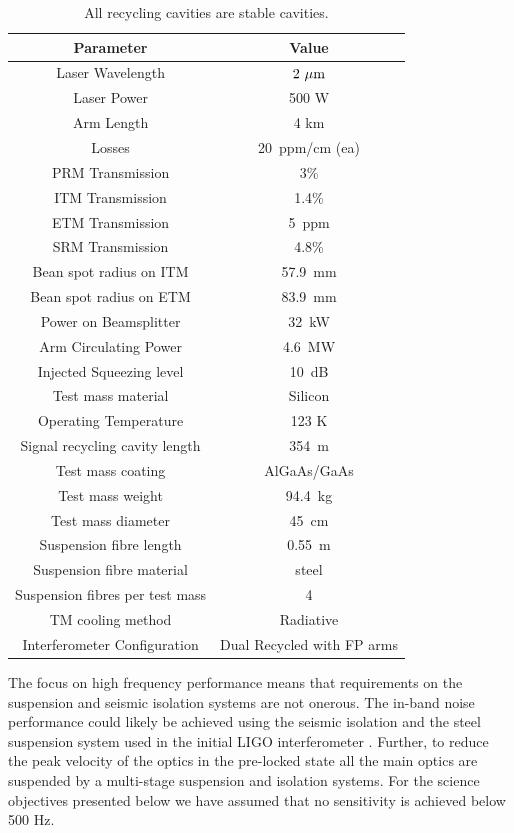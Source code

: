 \documentclass[prx,superscriptaddress,twocolumn,nopreprintnumbers,floatfix,nofootinbib]{revtex4}
\begin{document}
\begin{table}[]
    \centering
    \begin{tabular}{c c}
    
         Parameter & Value \\
         \hline
        \hline
         Laser Wavelength & $ 2~\rm{\mu m}$ \\
         Laser Power & 500 W \\
         Arm Length & 4 km \\ 
         Losses & 20~ppm/cm (ea) \\
         PRM Transmission & 3\% \\
         ITM Transmission & 1.4\% \\
         ETM Transmission & 5~ppm \\
         SRM Transmission & 4.8\% \\
         Bean spot radius on ITM & 57.9~mm\\
         Bean spot radius on ETM & 83.9~mm\\
         Power on Beamsplitter & 32~kW \\
         Arm Circulating Power & 4.6~MW \\
         Injected Squeezing level & 10~dB \\
         Test mass material & Silicon \\
         Operating Temperature & 123 K \\
         Signal recycling cavity length & 354~m \\
         Test mass coating & AlGaAs/GaAs \\
         Test mass weight & 94.4~kg \\
         Test mass diameter & 45~cm \\
         Suspension fibre length &	0.55~m \\
         Suspension fibre material & steel \\
         Suspension fibres per test mass &	4 \\
         TM cooling method & Radiative \\
         Interferometer Configuration & Dual Recycled with FP arms \\
         \hline
    \end{tabular}
    \caption{All recycling cavities are stable cavities.
    }
    \label{tab:design}
\end{table}

The focus on high frequency performance means that requirements on the suspension and seismic isolation systems are not onerous. The in-band noise performance could likely be achieved using the seismic isolation and the steel suspension system used in the initial LIGO interferometer \cite{abbott2009ligo}. Further, to reduce the peak velocity of the optics in the pre-locked state all the main optics are suspended by a multi-stage suspension and isolation systems. For the science objectives presented below we have assumed that no sensitivity is achieved below 500 Hz.
\end{document}
